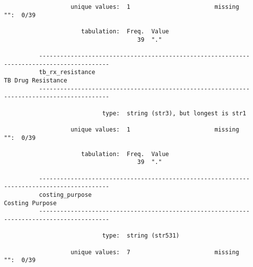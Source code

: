 \documentclass{article}
\begin{document}
\begin{verbatim}
                   unique values:  1                        missing "":  0/39
          
                      tabulation:  Freq.  Value
                                      39  "."
          
          ------------------------------------------------------------------------------------------
          tb_rx_resistance                                                        TB Drug Resistance
          ------------------------------------------------------------------------------------------
          
                            type:  string (str3), but longest is str1
          
                   unique values:  1                        missing "":  0/39
          
                      tabulation:  Freq.  Value
                                      39  "."
          
          ------------------------------------------------------------------------------------------
          costing_purpose                                                            Costing Purpose
          ------------------------------------------------------------------------------------------
          
                            type:  string (str531)
          
                   unique values:  7                        missing "":  0/39
          

\end{verbatim}
\end{document}
